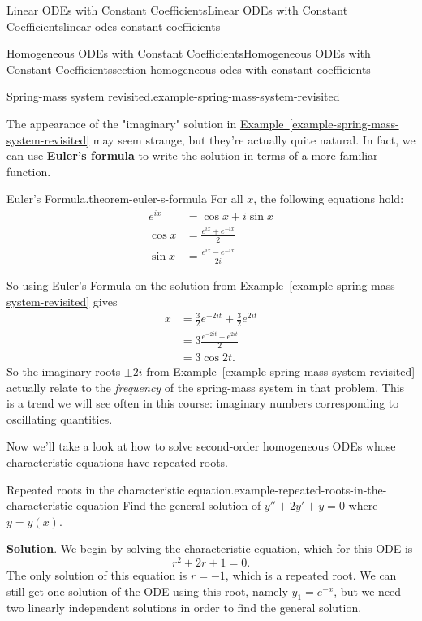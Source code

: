 \documentclass[oneside,10pt,]{book}
\newcommand{\terminology}[1]{\textbf{#1}}
\numberwithin{equation}{section}
\newcommand{\amp}{&}
\begin{document}
\begin{chapterptx}{Linear ODEs with Constant Coefficients}{}{Linear ODEs with Constant Coefficients}{}{}{linear-odes-constant-coefficients}
\begin{sectionptx}{Homogeneous ODEs with Constant Coefficients}{}{Homogeneous ODEs with Constant Coefficients}{}{}{section-homogeneous-odes-with-constant-coefficients}
\begin{example}{Spring-mass system revisited.}{example-spring-mass-system-revisited}
\begin{equation*}
\end{equation*}
%
\end{example}
\hypertarget{p-189}{}%
The appearance of the "imaginary" solution in \hyperref[example-spring-mass-system-revisited]{Example~\ref{example-spring-mass-system-revisited}} may seem strange, but they're actually quite natural. In fact, we can use \terminology{Euler's formula} to write the solution in terms of a more familiar function.%
\begin{theorem}{Euler's Formula.}{}{theorem-euler-s-formula}%
\hypertarget{p-190}{}%
For all \(x\), the following equations hold:%
\begin{align*}
e^{ix} \amp = \cos x + i\sin x \\
\cos x \amp = \frac{e^{ix}+e^{-ix}}{2} \\
\sin x \amp = \frac{e^{ix} - e^{-ix}}{2i} 
\end{align*}
%
\end{theorem}
\hypertarget{p-191}{}%
So using Euler's Formula on the solution from \hyperref[example-spring-mass-system-revisited]{Example~\ref{example-spring-mass-system-revisited}} gives%
\begin{align*}
x \amp = \frac{3}{2}e^{-2it} + \frac{3}{2} e^{2it} \\
\amp = 3\frac{e^{-2it} + e^{2it}}{2} \\
\amp = 3\cos2t. 
\end{align*}
So the imaginary roots \(\pm2i\) from \hyperref[example-spring-mass-system-revisited]{Example~\ref{example-spring-mass-system-revisited}} actually relate to the \emph{frequency} of the spring-mass system in that problem. This is a trend we will see often in this course: imaginary numbers corresponding to oscillating quantities.%
\par
\hypertarget{p-192}{}%
Now we'll take a look at how to solve second-order homogeneous ODEs whose characteristic equations have repeated roots.%
\begin{example}{Repeated roots in the characteristic equation.}{example-repeated-roots-in-the-characteristic-equation}%
\hypertarget{p-193}{}%
Find the general solution of \(y'' + 2y' + y = 0\) where \(y = y(x)\).%
\par\smallskip%
\noindent\textbf{Solution}.\hypertarget{solution-29}{}\quad%
\hypertarget{p-194}{}%
We begin by solving the characteristic equation, which for this ODE is%
\begin{equation*}
r^{2} + 2r + 1 = 0.
\end{equation*}
The only solution of this equation is \(r=-1\), which is a repeated root. We can still get one solution of the ODE using this root, namely \(y_{1} = e^{-x}\), but we need two linearly independent solutions in order to find the general solution.%

\end{example}
\end{sectionptx}
\end{chapterptx}
\end{document}
